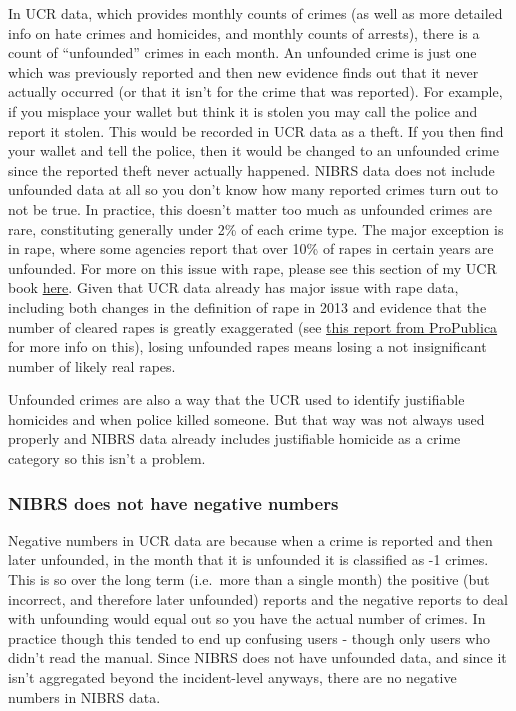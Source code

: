 \documentclass[
  12pt,
  openany]{book}
\begin{document}
In UCR data, which provides monthly counts of crimes (as well as more detailed info on hate crimes and homicides, and monthly counts of arrests), there is a count of ``unfounded'' crimes in each month. An unfounded crime is just one which was previously reported and then new evidence finds out that it never actually occurred (or that it isn't for the crime that was reported). For example, if you misplace your wallet but think it is stolen you may call the police and report it stolen. This would be recorded in UCR data as a theft. If you then find your wallet and tell the police, then it would be changed to an unfounded crime since the reported theft never actually happened. NIBRS data does not include unfounded data at all so you don't know how many reported crimes turn out to not be true. In practice, this doesn't matter too much as unfounded crimes are rare, constituting generally under 2\% of each crime type. The major exception is in rape, where some agencies report that over 10\% of rapes in certain years are unfounded. For more on this issue with rape, please see this section of my UCR book \href{https://ucrbook.com/offensesKnown.html\#unfounded-crimes}{here}.
Given that UCR data already has major issue with rape data, including both changes in the definition of rape in 2013 and evidence that the number of cleared rapes is greatly exaggerated (see \href{https://www.propublica.org/article/when-it-comes-to-rape-just-because-a-case-is-cleared-does-not-mean-solved}{this report from ProPublica} for more info on this), losing unfounded rapes means losing a not insignificant number of likely real rapes.

Unfounded crimes are also a way that the UCR used to identify justifiable homicides and when police killed someone. But that way was not always used properly and NIBRS data already includes justifiable homicide as a crime category so this isn't a problem.

\hypertarget{nibrs-does-not-have-negative-numbers}{%
\subsubsection{NIBRS does not have negative numbers}\label{nibrs-does-not-have-negative-numbers}}

Negative numbers in UCR data are because when a crime is reported and then later unfounded, in the month that it is unfounded it is classified as -1 crimes. This is so over the long term (i.e.~more than a single month) the positive (but incorrect, and therefore later unfounded) reports and the negative reports to deal with unfounding would equal out so you have the actual number of crimes. In practice though this tended to end up confusing users - though only users who didn't read the manual. Since NIBRS does not have unfounded data, and since it isn't aggregated beyond the incident-level anyways, there are no negative numbers in NIBRS data.
\end{document}

